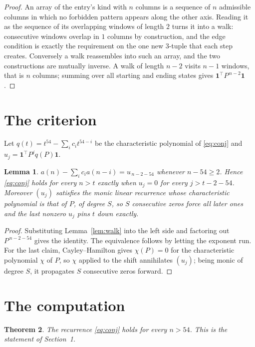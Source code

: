 \documentclass[11pt,a4paper]{article}
\theoremstyle{plain}
\newtheorem{theorem}{Theorem}
\newtheorem{lemma}[theorem]{Lemma}
\theoremstyle{definition}
\begin{document}
\begin{proof}
An array of the entry's kind with $n$ columns is a sequence of $n$ admissible columns in
which no forbidden pattern appears along the other axis. Reading it as the sequence of its
overlapping windows of length $2$ turns it into a walk: consecutive windows overlap in
$1$ columns by construction, and the edge condition is exactly the requirement on the one
new $3$-tuple that each step creates. Conversely a walk reassembles into such an array,
and the two constructions are mutually inverse. A walk of length $n-2$ visits $n-1$
windows, that is $n$ columns; summing over all starting and ending states gives
$\mathbf{1}^{\!\top}P^{\,n-2}\mathbf{1}$.
\end{proof}

\section{The criterion}

Let $q(t)=t^{54}-\sum_i c_i t^{54-i}$ be the characteristic polynomial of
\eqref{eq:conj} and $u_j=\mathbf{1}^{\!\top}P^{j}q(P)\mathbf{1}$.

\begin{lemma}\label{lem:crit}
$a(n)-\sum_i c_i a(n-i)=u_{\,n-2-54}$ whenever $n-54\ge2$. Hence
\eqref{eq:conj} holds for every $n>t$ exactly when $u_j=0$ for every
$j>t-2-54$. Moreover $(u_j)$ satisfies the monic linear recurrence whose
characteristic polynomial is that of $P$, of degree $S$, so $S$ consecutive zeros force all
later ones and the last nonzero $u_j$ pins $t$ down exactly.
\end{lemma}

\begin{proof}
Substituting Lemma~\ref{lem:walk} into the left side and factoring out
$P^{\,n-2-54}$ gives the identity. The equivalence follows by letting the exponent
run. For the last claim, Cayley--Hamilton gives $\chi(P)=0$ for the characteristic
polynomial $\chi$ of $P$, so $\chi$ applied to the shift annihilates $(u_j)$; being monic of
degree $S$, it propagates $S$ consecutive zeros forward.
\end{proof}

\section{The computation}

\begin{theorem}
The recurrence \eqref{eq:conj} holds for every $n>54$. This is the statement of
Section~1.
\end{theorem}
\end{document}

